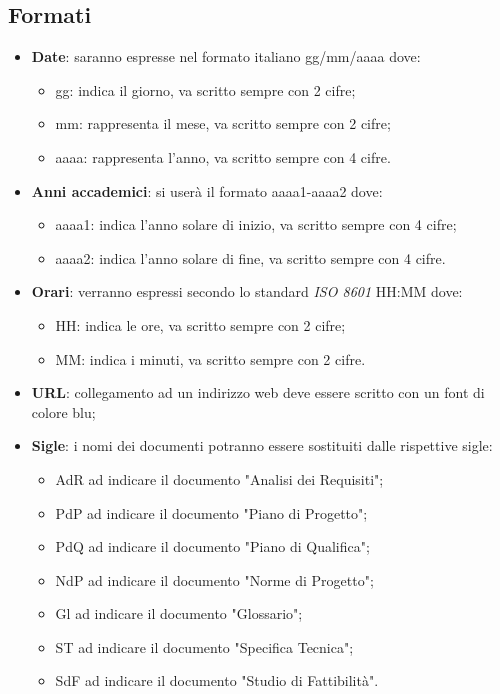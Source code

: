 \documentclass[12pt,a4paper,titlepage]{article}
\begin{document}
\subsection{Formati}
\begin{itemize}
	\item \textbf{Date}: saranno espresse nel formato italiano gg/mm/aaaa dove:
	\begin{itemize}
		\item gg: indica il giorno, va scritto sempre con 2 cifre;
		\item mm: rappresenta il mese, va scritto sempre con 2 cifre;
		\item aaaa: rappresenta l'anno, va scritto sempre con 4 cifre. 
	\end{itemize}

	\item \textbf{Anni accademici}: si userà il formato aaaa1-aaaa2 dove:
	\begin{itemize}
		\item aaaa1: indica l'anno solare di inizio, va scritto sempre con 4 cifre;
		\item aaaa2: indica l'anno solare di fine, va scritto sempre con 4 cifre.
	\end{itemize}

	\item \textbf{Orari}: verranno espressi secondo lo standard \textit{ISO 8601} HH:MM dove:
	\begin{itemize}
		\item HH: indica le ore, va scritto sempre con 2 cifre;
		\item MM: indica i minuti, va scritto sempre con 2 cifre.
	\end{itemize}

	\item \textbf{URL}: collegamento ad un indirizzo web deve essere scritto con un font di colore blu;
	
	\item \textbf{Sigle}: i nomi dei documenti potranno essere sostituiti dalle rispettive sigle:
	\begin{itemize}
		\item AdR ad indicare il documento "Analisi dei Requisiti";
		\item PdP ad indicare il documento "Piano di Progetto";
		\item PdQ ad indicare il documento "Piano di Qualifica";
		\item NdP ad indicare il documento "Norme di Progetto";
		\item Gl ad indicare il documento "Glossario";
		\item ST ad indicare il documento "Specifica Tecnica";
		\item SdF ad indicare il documento "Studio di Fattibilità".
	\end{itemize}
\end{itemize}
\end{document}
